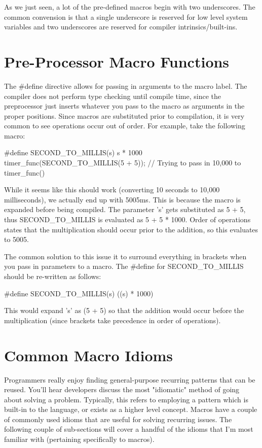 \documentclass{article}
\begin{document}
As we just seen, a lot of the pre-defined macros begin with two underscores. The common convension is that a
single underscore is reserved for low level system variables and two underscores are reserved for compiler
intrinsics/built-ins.

\section{Pre-Processor Macro Functions}

The \#define directive allows for passing in arguments to the macro label. The compiler does not perform type
checking until compile time, since the preprocessor just inserts whatever you pass to the macro as arguments
in the proper positions. Since macros are substituted prior to compilation, it is very common to see
operations occur out of order. For example, take the following macro:

\begin{clst}
#define SECOND_TO_MILLIS(s) s * 1000
    timer_func(SECOND_TO_MILLIS(5 + 5)); // Trying to pass in 10,000 to timer_func()
\end{clst}

While it seems like this should work (converting 10 seconds to 10,000 milliseconds), we actually end up with
5005ms. This is because the macro is expanded before being compiled. The parameter 's' gets substituted as
5 + 5, thus SECOND\_TO\_MILLIS is evaluated as 5 + 5 * 1000. Order of operations states that the
multiplication should occur prior to the addition, so this evaluates to 5005.

The common solution to this issue it to surround everything in brackets when you pass in parameters to a
macro. The \#define for SECOND\_TO\_MILLIS should be re-written as follows:

\begin{clst}
#define SECOND_TO_MILLIS(s) ((s) * 1000)
\end{clst}

This would expand 's' as (5 + 5) so that the addition would occur before the multiplication (since brackets
take precedence in order of operations).

\section{Common Macro Idioms}

Programmers really enjoy finding general-purpose recurring patterns that can be reused. You'll hear developers
discuss the most "idiomatic" method of going about solving a problem. Typically, this refers to employing a
pattern which is built-in to the language, or exists as a higher level concept. Macros have a couple of commonly
used idioms that are useful for solving recurring issues. The following couple of sub-sections will cover a
handful of the idioms that I'm most familiar with (pertaining specifically to macros).
\end{document}
